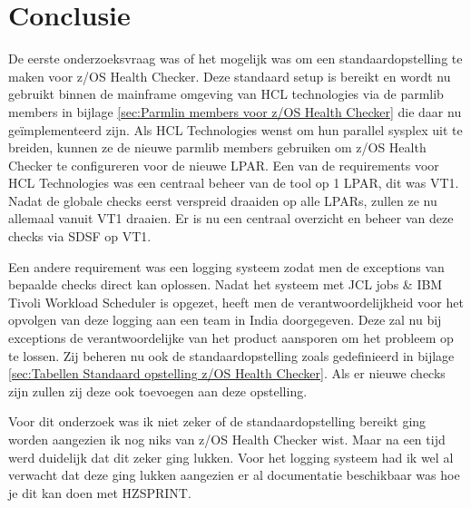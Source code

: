 
\chapter{Conclusie}
\label{ch:conclusie}


De eerste onderzoeksvraag was of het mogelijk was om een standaardopstelling te maken voor z/OS Health Checker. Deze standaard setup is bereikt en wordt nu gebruikt binnen de mainframe omgeving van HCL technologies via de parmlib members in bijlage \ref{sec:Parmlin members voor z/OS Health Checker} die daar nu geïmplementeerd zijn. Als HCL Technologies wenst om hun parallel sysplex uit te breiden, kunnen ze de nieuwe parmlib members gebruiken om z/OS Health Checker te configureren voor de nieuwe LPAR. Een van de requirements voor HCL Technologies was een centraal beheer van de tool op 1 LPAR, dit was VT1. Nadat de globale checks eerst verspreid draaiden op alle LPARs, zullen ze nu allemaal vanuit VT1 draaien. Er is nu een centraal overzicht en beheer van deze checks via SDSF op VT1. 

Een andere requirement was een logging systeem zodat men de exceptions van bepaalde checks direct kan oplossen. Nadat het systeem met JCL jobs \& IBM Tivoli Workload Scheduler is opgezet, heeft men de verantwoordelijkheid voor het opvolgen van deze logging aan een team in India doorgegeven. Deze zal nu bij exceptions de verantwoordelijke van het product aansporen om het probleem op te lossen. Zij beheren nu ook de standaardopstelling zoals gedefinieerd in bijlage \ref{sec:Tabellen Standaard opstelling z/OS Health Checker}. Als er nieuwe checks zijn zullen zij deze ook toevoegen aan deze opstelling.

Voor dit onderzoek was ik niet zeker of de standaardopstelling bereikt ging worden aangezien ik nog niks van z/OS Health Checker wist. Maar na een tijd werd duidelijk dat dit zeker ging lukken. Voor het logging systeem had ik wel al verwacht dat deze ging lukken aangezien er al documentatie beschikbaar was hoe je dit kan doen met HZSPRINT.

